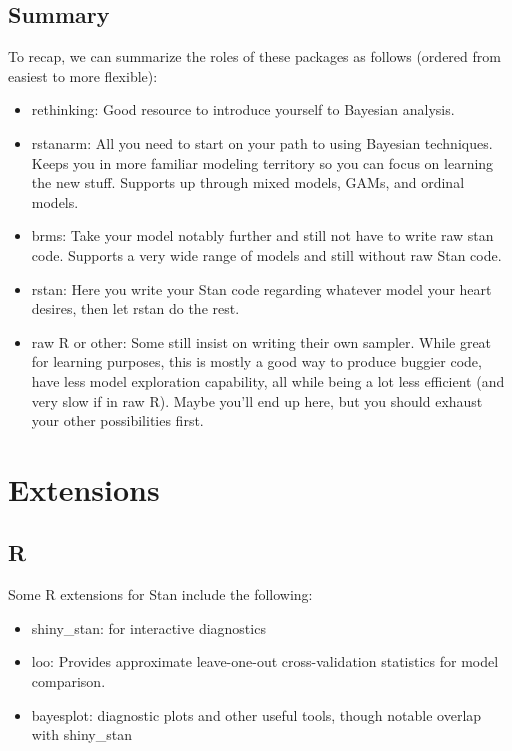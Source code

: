 \documentclass[]{book}
\providecommand{\tightlist}{%
  \setlength{\itemsep}{0pt}\setlength{\parskip}{0pt}}
\begin{document}
\section{Summary}\label{summary}

To recap, we can summarize the roles of these packages as follows
(ordered from easiest to more flexible):

\begin{itemize}
\item
  {rethinking}: Good resource to introduce yourself to Bayesian
  analysis.
\item
  {rstanarm}: All you need to start on your path to using Bayesian
  techniques. Keeps you in more familiar modeling territory so you can
  focus on learning the new stuff. Supports up through mixed models,
  GAMs, and ordinal models.
\item
  {brms}: Take your model notably further and still not have to write
  raw stan code. Supports a very wide range of models and still without
  raw Stan code.
\item
  {rstan}: Here you write your Stan code regarding whatever model your
  heart desires, then let rstan do the rest.
\item
  raw R or other: Some still insist on writing their own sampler. While
  great for learning purposes, this is mostly a good way to produce
  buggier code, have less model exploration capability, all while being
  a lot less efficient (and very slow if in raw R). Maybe you'll end up
  here, but you should exhaust your other possibilities first.
\end{itemize}

\chapter{Extensions}\label{extensions}

\section{R}\label{r-1}

Some R extensions for Stan include the following:

\begin{itemize}
\tightlist
\item
  {shiny\_stan}: for interactive diagnostics
\end{itemize}


\begin{itemize}
\item
  {loo}: Provides approximate leave-one-out cross-validation statistics
  for model comparison.
\item
  {bayesplot}: diagnostic plots and other useful tools, though notable
  overlap with shiny\_stan
\end{itemize}
\end{document}
